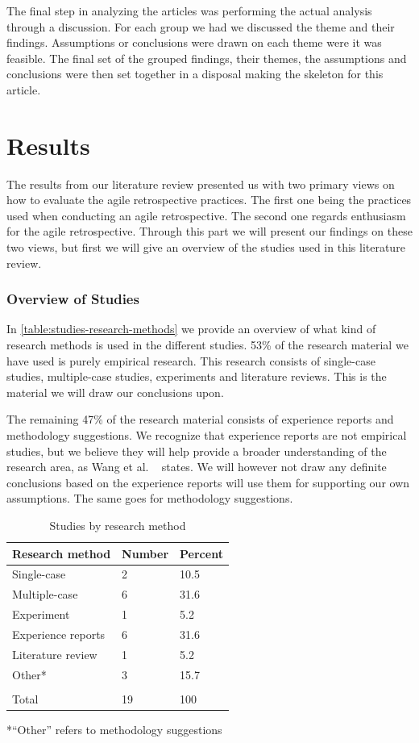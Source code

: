 \documentclass[12pt]{article}
\begin{document}
The final step in analyzing the articles was performing the actual analysis through a discussion. For each group we had we discussed the theme and their findings. Assumptions or conclusions were drawn on each theme were it was feasible. The final set of the grouped findings, their themes, the assumptions and conclusions were then set together in a disposal making the skeleton for this article. 

\clearpage

\part{Results}
The results from our literature review presented us with two primary views on how to evaluate the agile retrospective practices. The first one being the practices used when conducting an agile retrospective. The second one regards enthusiasm for the agile retrospective. Through this part we will present our findings on these two views, but first we will give an overview of the studies used in this literature review. 

\section{Overview of Studies}
In \autoref{table:studies-research-methods} we provide an overview of what kind of research methods is used in the different studies. 53\% of the research material we have used is purely empirical research. This research consists of single-case studies, multiple-case studies, experiments and literature reviews. This is the material we will draw our conclusions upon.

The remaining 47\% of the research material consists of experience reports and methodology suggestions. We recognize that experience reports are not empirical studies, but we believe they will help provide a broader understanding of the research area, as Wang et al. ~\cite{Wang2012} states. We will however not draw any definite conclusions based on the experience reports will use them for supporting our own assumptions. The same goes for methodology suggestions. 

\begin{table}[!h]
	\centering
	\caption{Studies by research method}
	\label{table:studies-research-methods}
	\begin{tabular}{ p{} p{} p{}}
		\hline
		Research method & Number & Percent \\ \hline
		Single-case & 2 & 10.5 \\
		Multiple-case & 6 & 31.6 \\
		Experiment & 1 & 5.2 \\
		Experience reports & 6 & 31.6 \\
		Literature review & 1 & 5.2 \\
		Other* & 3 & 15.7 \\
		\\
		Total & 19 & 100 \\ \hline
	\end{tabular}
	*``Other'' refers to methodology suggestions
\end{table}
\end{document}
